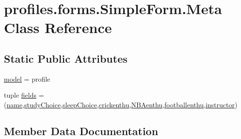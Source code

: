 \hypertarget{classprofiles_1_1forms_1_1SimpleForm_1_1Meta}{}\section{profiles.\+forms.\+Simple\+Form.\+Meta Class Reference}
\label{classprofiles_1_1forms_1_1SimpleForm_1_1Meta}
\subsection*{Static Public Attributes}
\begin{DoxyCompactItemize}
\item 
\hyperlink{classprofiles_1_1forms_1_1SimpleForm_1_1Meta_a9074e618eb956bf54c5a1e8b5bec702d}{model} = profile
\item 
tuple \hyperlink{classprofiles_1_1forms_1_1SimpleForm_1_1Meta_a0c22c44a508656fd360986838d98dfbe}{fields} = (\textquotesingle{}\hyperlink{classprofiles_1_1forms_1_1SimpleForm_a27db91136cd11af5441ac0a5df111c24}{name}\textquotesingle{},\textquotesingle{}\hyperlink{classprofiles_1_1forms_1_1SimpleForm_ada90dea452920f838181a9984b90e965}{study\+Choice}\textquotesingle{},\textquotesingle{}\hyperlink{classprofiles_1_1forms_1_1SimpleForm_ad6fcf3df4c2d202e9a1c40f9e5f2c226}{sleep\+Choice}\textquotesingle{},\textquotesingle{}\hyperlink{classprofiles_1_1forms_1_1SimpleForm_a2c83193b1e44093b0f631842847a1931}{crickenthu}\textquotesingle{},\textquotesingle{}\hyperlink{classprofiles_1_1forms_1_1SimpleForm_a791fd8196dfe174afb185e8f0357d807}{N\+B\+Aenthu}\textquotesingle{},\textquotesingle{}\hyperlink{classprofiles_1_1forms_1_1SimpleForm_a1ba5ebb75a3a8343d641d558ae85627b}{footballenthu}\textquotesingle{},\textquotesingle{}\hyperlink{classprofiles_1_1forms_1_1SimpleForm_a230df5633ff8ea343d627abe65564577}{instructor}\textquotesingle{})
\end{DoxyCompactItemize}


\subsection{Member Data Documentation}
